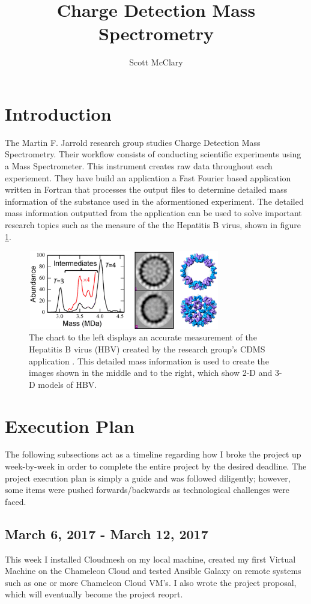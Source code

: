 \documentclass[9pt,twocolumn,twoside]{styles/osajnl}
\title{Charge Detection Mass Spectrometry}
\author[1,*]{Scott McClary}
\affil[1]{School of Informatics and Computing, Bloomington, IN 47408, U.S.A.}
\affil[*]{Corresponding authors: scmcclar@indiana.edu}
\begin{document}
\maketitle

\section{Introduction} \label{introduction}
The Martin F. Jarrold research group studies Charge Detection Mass
Spectrometry. Their workflow consists of conducting scientific
experiments using a Mass Spectrometer. This instrument creates raw
data throughout each experiement. They have build an application a
Fast Fourier based application written in Fortran that processes the
output files to determine detailed mass information of the substance
used in the aformentioned experiment. The detailed mass information
outputted from the application can be used to solve important research
topics such as the measure of the the Hepatitis B virus, shown in figure
\ref{fig:hbvassembly}.

\begin{figure}
\centering
\includegraphics[height=1.35in, width=3.3in]{images/hbvassembly}
\caption{The chart to the left displays an accurate measurement of the Hepatitis B virus (HBV) created by the research group's CDMS application \cite{247}. This detailed mass information is used to create the images shown in the middle and to the right, which show 2-D and 3-D models of HBV.}
\label{fig:hbvassembly}
\end{figure}

\section{Execution Plan} \label{plan}
The following subsections act as a timeline regarding how I broke the
project up week-by-week in order to complete the entire project by the
desired deadline. The project execution plan is simply a guide and was
followed diligently; however, some items were pushed
forwards/backwards as technological challenges were faced.
\subsection{March 6, 2017 - March 12, 2017}
This week I installed Cloudmesh on my local machine, created my first
Virtual Machine on the Chameleon Cloud and tested Ansible Galaxy on
remote systems such as one or more Chameleon Cloud VM's. I also wrote
the project proposal, which will eventually become the project reoprt.
\end{document}
